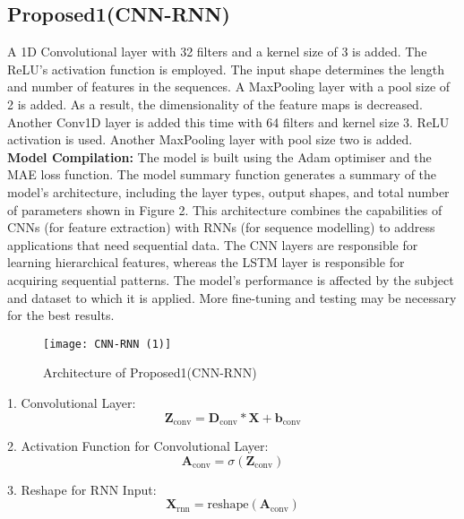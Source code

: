 \subsection{Proposed1(CNN-RNN)}A 1D Convolutional layer with 32 filters and a kernel size of 3 is added. The ReLU's activation function is employed. The input shape determines the length and number of features in the sequences. A MaxPooling layer with a pool size of 2 is added. As a result, the dimensionality of the feature maps is decreased. Another Conv1D layer is added this time with 64 filters and kernel size 3. ReLU activation is used.
Another MaxPooling layer with pool size two is added.\\
\textbf{Model Compilation:} The model is built using the Adam optimiser and the MAE loss function. The model summary function generates a summary of the model's architecture, including the layer types, output shapes, and total number of parameters shown in Figure 2. This architecture combines the capabilities of CNNs (for feature extraction) with RNNs (for sequence modelling) to address applications that need sequential data. The CNN layers are responsible for learning hierarchical features, whereas the LSTM layer is responsible for acquiring sequential patterns. The model's performance is affected by the subject and dataset to which it is applied. More fine-tuning and testing may be necessary for the best results.




\begin{figure}[!ht]
\centering
\texttt{[image: CNN-RNN (1)]}
\caption{Architecture of Proposed1(CNN-RNN)}
\label{}
\end{figure}





1. Convolutional Layer:
\begin{equation}
\mathbf{Z}_{\text{conv}} = \mathbf{D}_{\text{conv}} * \mathbf{X} + \mathbf{b}_{\text{conv}}
\end{equation}

2. Activation Function for Convolutional Layer:
\begin{equation}
\mathbf{A}_{\text{conv}} = \sigma(\mathbf{Z}_{\text{conv}})
\end{equation}

3. Reshape for RNN Input:
\begin{equation}
\mathbf{X}_{\text{rnn}} = \text{reshape}(\mathbf{A}_{\text{conv}})
\end{equation}

